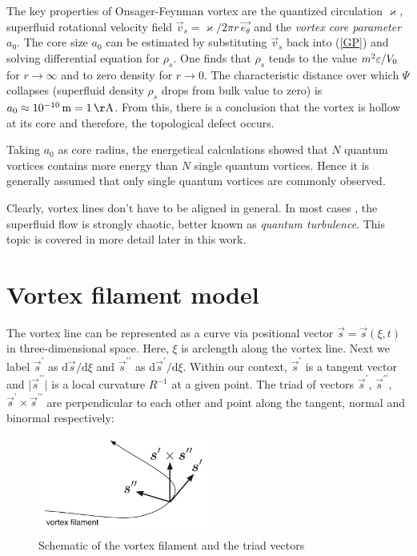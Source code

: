 The key properties of Onsager-Feynman vortex are the quantized circulation $\varkappa$, superfluid rotational velocity field $\vec{v}_s = \varkappa / 2\pi r\, \vec{e_{\theta}}$ and the \textit{vortex core parameter} $a_0$. The core size $a_0$ can be estimated by substituting $\vec{v}_s$ back into (\ref{GP}) and solving differential equation for $\rho_s$. One finds that $\rho_s$ tends to the value $m^2 \varepsilon / V_0$ for $r \rightarrow \infty$ and to zero density for $r \rightarrow 0$.
The characteristic distance over which $\Psi$ collapses (superfluid density $\rho_s$ drops from bulk value to zero) is $a_0 \approx 10^{-10} \unit{m} = 1 \unit{\AA}$. From this, there is a conclusion that the vortex is hollow at its core and therefore, the topological defect occurs.

Taking $a_0$ as core radius, the energetical calculations showed that $N$ quantum vortices contains more energy than $N$ single quantum vortices. Hence it is generally assumed that only single quantum vortices are commonly observed.

Clearly, vortex lines don't have to be aligned in general. In most cases , the superfluid flow is strongly chaotic, better known as \textit{quantum turbulence}. This topic is covered in more detail later in this work.


\section{Vortex filament model}

The vortex line can be represented as a curve via positional vector $\vec{s} = \vec{s}(\xi, t)$ in three-dimensional space. Here, $\xi$ is arclength along the vortex line. Next we label $\vec{s}^{\prime}$ as $\text{d}\vec{s} / \text{d} \xi$ and $\vec{s}^{\prime\prime}$ as $\text{d}\vec{s}^{\prime} / \text{d} \xi$.
Within our context, $\vec{s}^{\prime}$ is a tangent vector and $\vert \vec{s}^{\prime\prime} \vert$ is a local curvature $R^{-1}$ at a given point. The triad of vectors $\vec{s}^{\prime}$, $\vec{s}^{\prime\prime}$, $\vec{s}^{\prime} \times \vec{s}^{\prime\prime}$ are perpendicular to each other and point along the tangent, normal and binormal respectively:

\begin{figure}[h]
	\centering
	\includegraphics[width=0.5\textwidth]{graphics/theory/filament}
	\caption{Schematic of the vortex filament and the triad vectors}
	\label{filament}
\end{figure}


